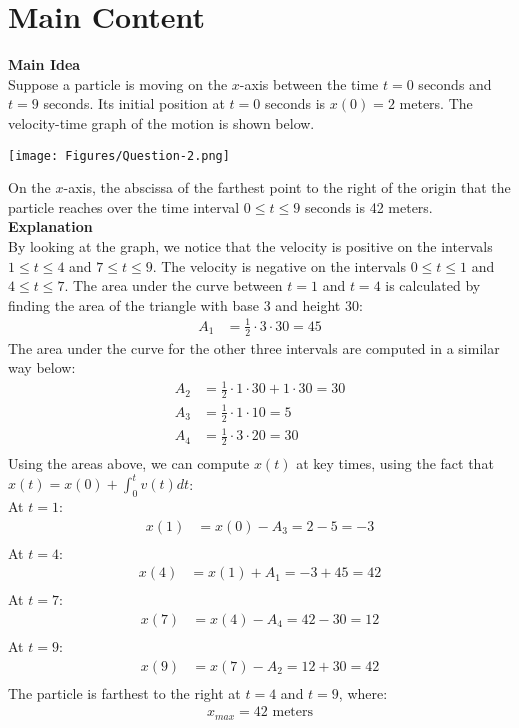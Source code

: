 \section*{Main Content}
\textbf{Main Idea}\\
Suppose a particle is moving on the $x$-axis between the time $t=0$ seconds and $t = 9$ seconds. Its initial position at $t=0$ seconds is $x(0)=2$ meters. 
The velocity-time graph of the motion is shown below.\\
\begin{center}
  \texttt{[image: Figures/Question-2.png]}\\
\end{center}
On the $x$-axis, the abscissa of the farthest point to the right of the origin that the particle reaches over the time interval $0 \leq t \leq 9$ seconds is 42 meters.
\textbf{Explanation}\\
By looking at the graph, we notice that the velocity is positive on the intervals $1 \leq t \leq 4$ and $7 \leq t \leq 9$. The velocity is negative on the intervals $0 \leq t \leq 1$ and $4 \leq t \leq 7$.
The area under the curve between $t = 1$ and $t=4$ is calculated by finding the area of the triangle with base 3 and height 30:
\begin{align*}
  A_1 &= \frac{1}{2} \cdot 3 \cdot 30 = 45
\end{align*}
The area under the curve for the other three intervals are computed in a similar way below:
\begin{align*}
  A_2 &= \frac{1}{2} \cdot 1 \cdot 30 + 1 \cdot 30 = 30\\
  A_3 &= \frac{1}{2} \cdot 1 \cdot 10 = 5\\
  A_4 &= \frac{1}{2} \cdot 3 \cdot 20 = 30\\
\end{align*}
Using the areas above, we can compute $x(t)$ at key times, using the fact that $x(t) = x(0) + \int_0^t v(t) dt$:\\
At $t=1$:
\begin{align*}
  x(1) &= x(0) - A_3 = 2 - 5 = -3\\
\end{align*}
At $t = 4$:
\begin{align*}
  x(4) &= x(1) + A_1 = -3 + 45 = 42\\
\end{align*}
At $t = 7$:
\begin{align*}
  x(7) &= x(4) - A_4 = 42 - 30 = 12\\
\end{align*}
At $t = 9$:
\begin{align*}
  x(9) &= x(7) - A_2 = 12 + 30 = 42\\
\end{align*}
The particle is farthest to the right at $t = 4$ and $t = 9$, where:
\begin{align*}
  x_{max} = 42 \text{ meters}
\end{align*}

